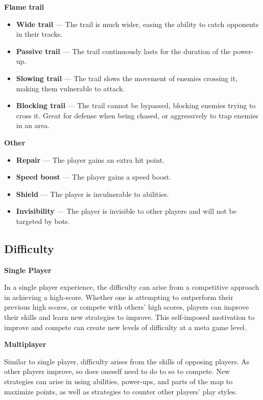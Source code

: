 \documentclass{article}
\theoremstyle{definition}
\begin{document}
\textbf{Flame trail}
\begin{itemize}
  \item \textbf{Wide trail} --- The trail is much wider, easing the ability to
    catch opponents in their tracks.
  \item \textbf{Passive trail} --- The trail continuously lasts for the duration
    of the power-up.
  \item \textbf{Slowing trail} --- The trail slows the movement of enemies
    crossing it, making them vulnerable to attack.
  \item \textbf{Blocking trail} --- The trail cannot be bypassed, blocking
    enemies trying to cross it. Great for defense when being chased, or
    aggressively to trap enemies in an area.
\end{itemize}

\textbf{Other}
\begin{itemize}
  \item \textbf{Repair} --- The player gains an extra hit point.
  \item \textbf{Speed boost} --- The player gains a speed boost.
  \item \textbf{}\textbf{Shield} --- The player is invulnerable to abilities.
  \item \textbf{Invisibility} --- The player is invisible to other players and
    will not be targeted by bots.
\end{itemize}

\subsection{Difficulty}

\textbf{Single Player}

In a single player experience, the difficulty can arise
from a competitive approach in achieving a high-score. Whether one is
attempting to outperform their previous high scores, or compete with others'
high scores, players can improve their skills and learn new strategies to
improve. This self-imposed motivation to improve and compete can create new
levels of difficulty at a meta game level.

\textbf{Multiplayer}

Similar to single player, difficulty arises from the skills of opposing
players. As other players improve, so does oneself need to do to so to compete.
New strategies can arise in using abilities, power-ups, and parts of the map to
maximize points, as well as strategies to counter other players' play styles.
\end{document}
